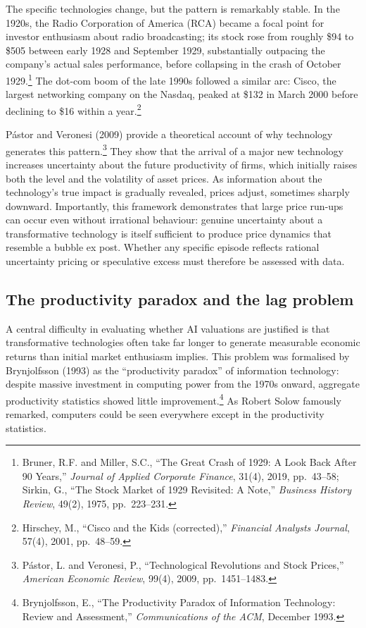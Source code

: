 \documentclass[12pt,a4paper]{article}
\begin{document}
The specific technologies change, but the pattern is remarkably stable. In the 1920s, the Radio Corporation of America (RCA) became a focal point for investor enthusiasm about radio broadcasting; its stock rose from roughly \$94 to \$505 between early 1928 and September 1929, substantially outpacing the company's actual sales performance, before collapsing in the crash of October 1929.\footnote{Bruner, R.F. and Miller, S.C., ``The Great Crash of 1929: A Look Back After 90 Years,'' \textit{Journal of Applied Corporate Finance}, 31(4), 2019, pp.\ 43--58; Sirkin, G., ``The Stock Market of 1929 Revisited: A Note,'' \textit{Business History Review}, 49(2), 1975, pp.\ 223--231.} The dot-com boom of the late 1990s followed a similar arc: Cisco, the largest networking company on the Nasdaq, peaked at \$132 in March 2000 before declining to \$16 within a year.\footnote{Hirschey, M., ``Cisco and the Kids (corrected),'' \textit{Financial Analysts Journal}, 57(4), 2001, pp.\ 48--59.}

P\'{a}stor and Veronesi (2009) provide a theoretical account of why technology generates this pattern.\footnote{P\'{a}stor, L. and Veronesi, P., ``Technological Revolutions and Stock Prices,'' \textit{American Economic Review}, 99(4), 2009, pp.\ 1451--1483.} They show that the arrival of a major new technology increases uncertainty about the future productivity of firms, which initially raises both the level and the volatility of asset prices. As information about the technology's true impact is gradually revealed, prices adjust, sometimes sharply downward. Importantly, this framework demonstrates that large price run-ups can occur even without irrational behaviour: genuine uncertainty about a transformative technology is itself sufficient to produce price dynamics that resemble a bubble ex post. Whether any specific episode reflects rational uncertainty pricing or speculative excess must therefore be assessed with data.

\subsection{The productivity paradox and the lag problem}

A central difficulty in evaluating whether AI valuations are justified is that transformative technologies often take far longer to generate measurable economic returns than initial market enthusiasm implies. This problem was formalised by Brynjolfsson (1993) as the ``productivity paradox'' of information technology: despite massive investment in computing power from the 1970s onward, aggregate productivity statistics showed little improvement.\footnote{Brynjolfsson, E., ``The Productivity Paradox of Information Technology: Review and Assessment,'' \textit{Communications of the ACM}, December 1993.} As Robert Solow famously remarked, computers could be seen everywhere except in the productivity statistics.
\end{document}
